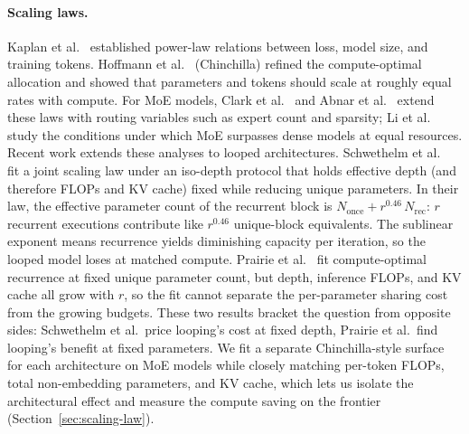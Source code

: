 \documentclass[]{bytedance_seed}
\theoremstyle{definition}
\theoremstyle{remark}
\begin{document}
\paragraph{Scaling laws.}
Kaplan et al.~\cite{kaplan2020scaling} established power-law relations between loss, model size, and training tokens.
%
Hoffmann et al.~\cite{hoffmann2022training} (Chinchilla) refined the compute-optimal allocation and showed that parameters and tokens should scale at roughly equal rates with compute.
%
For MoE models, Clark et al.~\cite{clark2022unified} and Abnar et al.~\cite{abnar2025parameters} extend these laws with routing variables such as expert count and sparsity; Li et al.~\cite{li2025moe} study the conditions under which MoE surpasses dense models at equal resources.
%
Recent work extends these analyses to looped architectures.
%
Schwethelm et al.~\cite{schwethelm2026recurrence} fit a joint scaling law under an iso-depth protocol that holds effective depth (and therefore FLOPs and KV cache) fixed while reducing unique parameters.
%
In their law, the effective parameter count of the recurrent block is $N_{\mathrm{once}} + r^{0.46}\,N_{\mathrm{rec}}$: $r$ recurrent executions contribute like $r^{0.46}$ unique-block equivalents.
%
The sublinear exponent means recurrence yields diminishing capacity per iteration, so the looped model loses at matched compute.
%
Prairie et al.~\cite{prairie2026parcae} fit compute-optimal recurrence at fixed unique parameter count, but depth, inference FLOPs, and KV cache all grow with $r$, so the fit cannot separate the per-parameter sharing cost from the growing budgets.
%
These two results bracket the question from opposite sides: Schwethelm et al.\ price looping's cost at fixed depth, Prairie et al.\ find looping's benefit at fixed parameters.
%
We fit a separate Chinchilla-style surface for each architecture on MoE models while closely matching per-token FLOPs, total non-embedding parameters, and KV cache, which lets us isolate the architectural effect and measure the compute saving on the frontier (Section~\ref{sec:scaling-law}).
%
\end{document}
